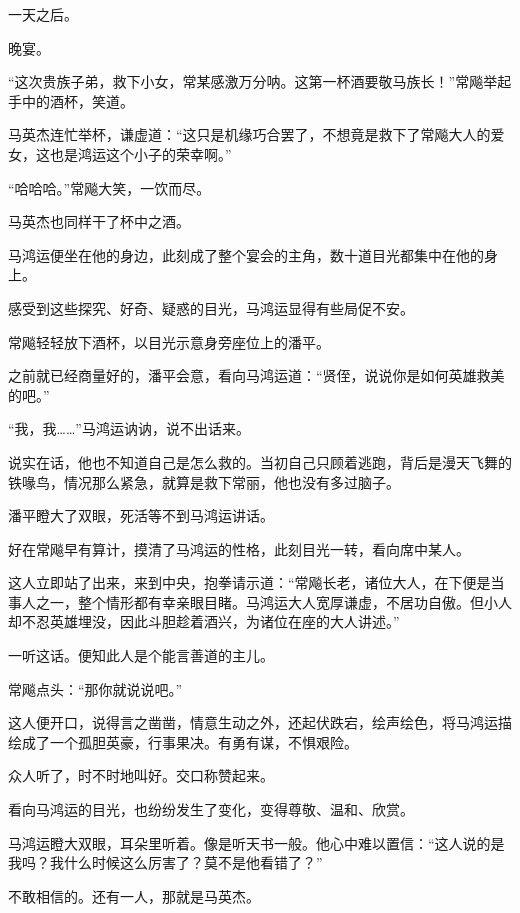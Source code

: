 
\begin{this_body}

一天之后。

晚宴。

“这次贵族子弟，救下小女，常某感激万分呐。这第一杯酒要敬马族长！”常飚举起手中的酒杯，笑道。

马英杰连忙举杯，谦虚道：“这只是机缘巧合罢了，不想竟是救下了常飚大人的爱女，这也是鸿运这个小子的荣幸啊。”

“哈哈哈。”常飚大笑，一饮而尽。

马英杰也同样干了杯中之酒。

马鸿运便坐在他的身边，此刻成了整个宴会的主角，数十道目光都集中在他的身上。

感受到这些探究、好奇、疑惑的目光，马鸿运显得有些局促不安。

常飚轻轻放下酒杯，以目光示意身旁座位上的潘平。

之前就已经商量好的，潘平会意，看向马鸿运道：“贤侄，说说你是如何英雄救美的吧。”

“我，我……”马鸿运讷讷，说不出话来。

说实在话，他也不知道自己是怎么救的。当初自己只顾着逃跑，背后是漫天飞舞的铁喙鸟，情况那么紧急，就算是救下常丽，他也没有多过脑子。

潘平瞪大了双眼，死活等不到马鸿运讲话。

好在常飚早有算计，摸清了马鸿运的性格，此刻目光一转，看向席中某人。

这人立即站了出来，来到中央，抱拳请示道：“常飚长老，诸位大人，在下便是当事人之一，整个情形都有幸亲眼目睹。马鸿运大人宽厚谦虚，不居功自傲。但小人却不忍英雄埋没，因此斗胆趁着酒兴，为诸位在座的大人讲述。”

一听这话。便知此人是个能言善道的主儿。

常飚点头：“那你就说说吧。”

这人便开口，说得言之凿凿，情意生动之外，还起伏跌宕，绘声绘色，将马鸿运描绘成了一个孤胆英豪，行事果决。有勇有谋，不惧艰险。

众人听了，时不时地叫好。交口称赞起来。

看向马鸿运的目光，也纷纷发生了变化，变得尊敬、温和、欣赏。

马鸿运瞪大双眼，耳朵里听着。像是听天书一般。他心中难以置信：“这人说的是我吗？我什么时候这么厉害了？莫不是他看错了？”

不敢相信的。还有一人，那就是马英杰。


\end{this_body}
